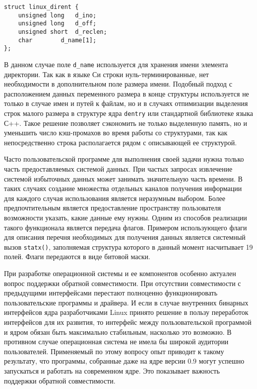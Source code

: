 \medskip
\begin{lstlisting}[style=cstyle]
struct linux_dirent {
	unsigned long	d_ino;
	unsigned long	d_off;
	unsigned short	d_reclen;
	char		d_name[1];
};
\end{lstlisting}
\medskip

В данном случае поле \texttt{d\_name} используется для хранения имени элемента
директории. Так как в языке Си строки нуль-терминированные, нет необходимости в
дополнительном поле размера имени. Подобный подход с расположением данных
переменного размера в конце структуры используется не только в случае имен и
путей к файлам, но и в случаях отпимизации выделения строк малого размера в
структуре ядра \texttt{dentry} или стандартной библиотеке языка С++. Такое
решение позволяет сэкономить не только выделенную память, но и уменьшить число
кэш-промахов во время работы со структурами, так как непосредственно строка
располагается рядом с описывающей ее структурой.

Часто пользовательской программе для выполнения своей задачи нужна только часть
предоставляемых системой данных. При частых запросах извлечение системой
избыточных данных может занимать значительную часть времени. В таких случаях
создание множества отдельных каналов получения информации для каждого случая
использования является неразумным выбором. Более предпочтительным является
предоставление пространству пользователя возможности указать, какие данные ему
нужны. Одним из способов реализации такого функционала является передача флагов.
Примером использующего флаги для описания перечня необходимых для получения
данных является системный вызов \texttt{statx()}, заполняемая структура которого
в данный момент насчитывает 19 полей. Флаги передаются в виде битовой маски.

При разработке операционной системы и ее компонентов особенно актуален вопрос
поддержки обратной совместимости. При отсутствии совместимости с предыдущими
интерфейсами перестают полноценно функционировать пользовательские программы и
драйвера. И если в случае внутренних бинарных интерфейсов ядра разработчиками
Linux принято решение в пользу переработок интерфейсов для их развития, то
интерфейс между пользовательской программой и ядром обязан быть максимально
стабильным, насколько это возможно. В противном случае операционная система не
имела бы широкой аудитории пользователей. Применяемый по этому вопросу опыт
приводит к такому результату, что программы, собранные даже на ядре версии 0.9
могут успешно  запускаться и работать на современном ядре. Это показывает
важность поддержки обратной совместимости.

